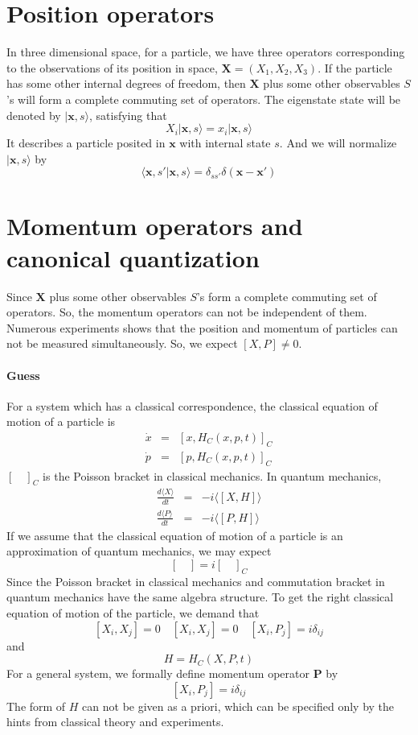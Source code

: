 \section{Position operators}
\noindent
In three dimensional space, for a particle, we have three operators corresponding to the observations of its position in space, $\bm{X} = (X_1, X_2, X_3)$. If the particle has some other internal degrees of freedom, then $\bm{X}$ plus some other observables $S$'s will form  a complete commuting set of operators. The eigenstate state will be denoted by $| \bm{x},s \rangle$, satisfying that
\[X_i | \bm{x},s \rangle = x_i | \bm{x},s \rangle  \]
It describes a particle posited in $\bm{x}$ with internal state $s$. And we will normalize $| \bm{x},s \rangle $ by 
\[\langle \bm{x},s'| \bm{x},s \rangle = \delta_{ss'}\delta(\bm{x}-\bm{x}')\]

\section{Momentum operators and canonical quantization}
\noindent
Since $\bm{X}$ plus some other observables $S$'s form a complete commuting set of operators. So, the momentum operators can not be independent of them. Numerous experiments shows that the position and momentum of particles can not be measured simultaneously. So, we expect $[X,P] \neq 0$.
\paragraph{Guess} 
For a system which has a classical correspondence, the classical equation of motion of a particle is
\begin{eqnarray}
\dot{x} &=& [x,H_C(x,p,t)]_C \nonumber \\
\dot{p} &=& [p,H_C(x,p,t)]_C \nonumber
\end{eqnarray}
$[\quad]_C$ is the Poisson bracket in classical mechanics. In quantum mechanics,
\begin{eqnarray}
\frac{d\langle X \rangle}{dt} &=& -i \langle [X,H] \rangle \nonumber \\
\frac{d\langle P \rangle}{dt} &=& -i \langle [P,H] \rangle \nonumber
\end{eqnarray}
If we assume that the classical equation of motion of a particle is an approximation of quantum mechanics, we may expect
\[[\quad] = i [\quad]_C \]
Since the Poisson bracket in classical mechanics and commutation bracket in quantum mechanics have the same algebra structure. To get the right classical equation of motion of the particle, we demand that
\[[X_i,X_j] = 0 \quad [X_i,X_j] = 0 \quad [X_i,P_j] = i \delta_{ij}\]
and
\[H = H_C(X,P,t)\]
For a general system, we formally define momentum operator $\bm{P}$ by 
\[[X_i,P_j] = i \delta_{ij}\]
The form of $H$ can not be given as a priori, which can be specified only by the hints from classical theory and experiments.

